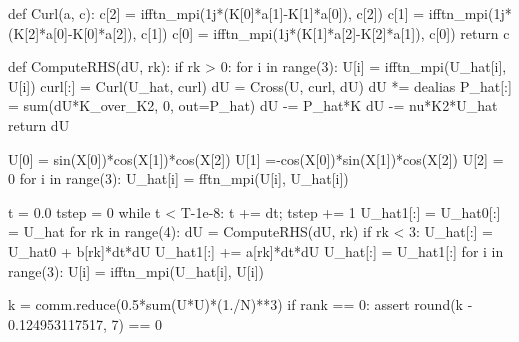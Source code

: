 \documentclass[final,1p,times]{elsarticle}
\begin{document}
\begin{python}
def Curl(a, c):
    c[2] = ifftn_mpi(1j*(K[0]*a[1]-K[1]*a[0]), c[2])
    c[1] = ifftn_mpi(1j*(K[2]*a[0]-K[0]*a[2]), c[1])
    c[0] = ifftn_mpi(1j*(K[1]*a[2]-K[2]*a[1]), c[0])
    return c

def ComputeRHS(dU, rk):
    if rk > 0:
        for i in range(3):
            U[i] = ifftn_mpi(U_hat[i], U[i])
    curl[:] = Curl(U_hat, curl)
    dU = Cross(U, curl, dU)
    dU *= dealias
    P_hat[:] = sum(dU*K_over_K2, 0, out=P_hat)
    dU -= P_hat*K
    dU -= nu*K2*U_hat
    return dU

U[0] = sin(X[0])*cos(X[1])*cos(X[2])
U[1] =-cos(X[0])*sin(X[1])*cos(X[2])
U[2] = 0
for i in range(3):
    U_hat[i] = fftn_mpi(U[i], U_hat[i])

t = 0.0
tstep = 0
while t < T-1e-8:
    t += dt; tstep += 1
    U_hat1[:] = U_hat0[:] = U_hat
    for rk in range(4):
        dU = ComputeRHS(dU, rk)
        if rk < 3: U_hat[:] = U_hat0 + b[rk]*dt*dU
        U_hat1[:] += a[rk]*dt*dU
    U_hat[:] = U_hat1[:]
    for i in range(3):
        U[i] = ifftn_mpi(U_hat[i], U[i])

k = comm.reduce(0.5*sum(U*U)*(1./N)**3)
if rank == 0:
    assert round(k - 0.124953117517, 7) == 0

\end{python}
\end{document}
